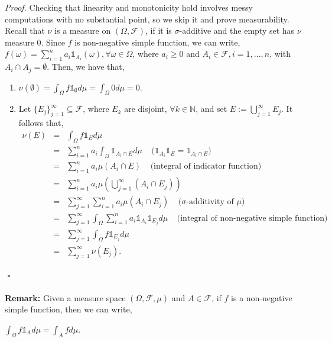 \documentclass{article}
\begin{document}
\textit{Proof.} Checking that linearity and monotonicity hold involves messy computations with no substantial point, so we skip it and prove measurability. Recall that $\nu$ is a measure on $(\Omega,\mathcal{F})$, if it is $\sigma$-additive and the empty set has $\nu$ measure $0$. Since $f$ is non-negative simple function, we can write, $f(\omega) = \sum_{i=1}^{n}a_i \mathds{1}_{A_i}(\omega), \forall \omega \in \Omega$, where $a_i \geq 0$ and $A_i \in \mathcal{F}, i = 1,...,n$, with $A_i \cap A_j = \emptyset$. Then, we have that,
\begin{enumerate}
	\item $\nu(\emptyset) = \int_\Omega f \mathds{1}_\emptyset d\mu = \int_\Omega 0 d\mu = 0$.
	\item Let $\{E_j\}_{j=1}^{\infty} \subseteq \mathcal{F}$, where $E_k$ are disjoint, $\forall k \in \mathbb{N}$, and set $E := \bigcup_{j=1}^{\infty}E_j$. It follows that,
	\begin{eqnarray}
	\nonumber
	\nu(E) &=& \int_\Omega f \mathds{1}_E d\mu\\
	\nonumber
	&=& \sum_{i=1}^{n}a_i \int_\Omega \mathds{1}_{A_i \cap E} d\mu \ \ \ \ \ \text{($\mathds{1}_{A_i}\mathds{1}_E = \mathds{1}_{A_i \cap E}$)} \\
	\nonumber
	&=& \sum_{i=1}^{n}a_i \mu(A_i \cap E) \ \ \ \ \ \text{(integral of indicator function)} \\
	\nonumber
	&=& \sum_{i=1}^{n}a_i \mu\left(\bigcup_{j=1}^{\infty}(A_i \cap E_j)\right) \\
	\nonumber
	&=& \sum_{j=1}^{\infty}\sum_{i=1}^{n}a_i \mu(A_i \cap E_j) \ \ \ \ \ \text{($\sigma$-additivity of $\mu$)} \\
	\nonumber
	&=& \sum_{j=1}^{\infty}\int_\Omega \sum_{i=1}^{n}a_i \mathds{1}_{A_i}\mathds{1}_{E_j} d\mu \ \ \ \ \ \text{(integral of non-negative simple function)} \\
	\nonumber
	&=& \sum_{j=1}^{\infty}\int_\Omega f \mathds{1}_{E_j} d\mu \\
	\nonumber
	&=& \sum_{j=1}^{\infty}\nu(E_j).
	\end{eqnarray}
\end{enumerate}
${}$ \hfill $\square$\\\\
\textbf{Remark:} Given a measure space $(\Omega,\mathcal{F},\mu)$ and $A \in \mathcal{F}$, if $f$ is a non-negative simple function, then we can write,
\begin{center}
	$\int_\Omega f \mathds{1}_A d\mu = \int_A f d\mu$.
\end{center}
\end{document}
